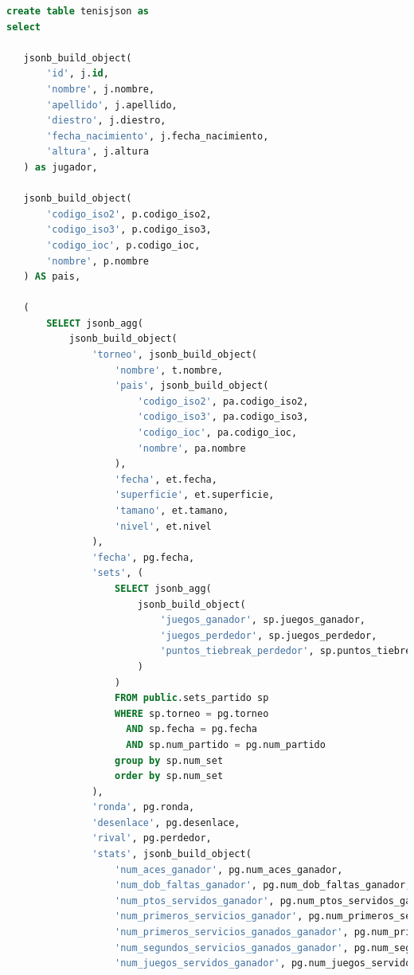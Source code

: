 \documentclass[10pt]{opticajnl}
\begin{document}
\begin{lstlisting}[language=SQL]
create table tenisjson as
select

   jsonb_build_object(
       'id', j.id,
       'nombre', j.nombre,
       'apellido', j.apellido,
       'diestro', j.diestro,
       'fecha_nacimiento', j.fecha_nacimiento,
       'altura', j.altura
   ) as jugador,

   jsonb_build_object(
       'codigo_iso2', p.codigo_iso2,
       'codigo_iso3', p.codigo_iso3,
       'codigo_ioc', p.codigo_ioc,
       'nombre', p.nombre
   ) AS pais,

   (
       SELECT jsonb_agg(
           jsonb_build_object(
               'torneo', jsonb_build_object(
                   'nombre', t.nombre,
                   'pais', jsonb_build_object(
                       'codigo_iso2', pa.codigo_iso2,
                       'codigo_iso3', pa.codigo_iso3,
                       'codigo_ioc', pa.codigo_ioc,
                       'nombre', pa.nombre
                   ),
                   'fecha', et.fecha,
                   'superficie', et.superficie,
                   'tamano', et.tamano,
                   'nivel', et.nivel
               ),
               'fecha', pg.fecha,
               'sets', (
                   SELECT jsonb_agg(
                       jsonb_build_object(
                           'juegos_ganador', sp.juegos_ganador,
                           'juegos_perdedor', sp.juegos_perdedor,
                           'puntos_tiebreak_perdedor', sp.puntos_tiebreak_perdedor
                       )
                   )
                   FROM public.sets_partido sp
                   WHERE sp.torneo = pg.torneo
                     AND sp.fecha = pg.fecha
                     AND sp.num_partido = pg.num_partido
                   group by sp.num_set
                   order by sp.num_set
               ),
               'ronda', pg.ronda,
               'desenlace', pg.desenlace,
               'rival', pg.perdedor,
               'stats', jsonb_build_object(
                   'num_aces_ganador', pg.num_aces_ganador,
                   'num_dob_faltas_ganador', pg.num_dob_faltas_ganador,
                   'num_ptos_servidos_ganador', pg.num_ptos_servidos_ganador,
                   'num_primeros_servicios_ganador', pg.num_primeros_servicios_ganador,
                   'num_primeros_servicios_ganados_ganador', pg.num_primeros_servicios_ganados_ganador,
                   'num_segundos_servicios_ganados_ganador', pg.num_segundos_servicios_ganados_ganador,
                   'num_juegos_servidos_ganador', pg.num_juegos_servidos_ganador,

\end{lstlisting}
\end{document}
